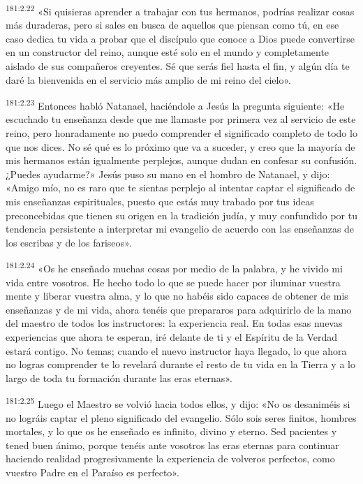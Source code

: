\par 
\textsuperscript{181:2.22} «Si quisieras aprender a trabajar con tus hermanos, podrías realizar cosas más duraderas, pero si sales en busca de aquellos que piensan como tú, en ese caso dedica tu vida a probar que el discípulo que conoce a Dios puede convertirse en un constructor del reino, aunque esté solo en el mundo y completamente aislado de sus compañeros creyentes. Sé que serás fiel hasta el fin, y algún día te daré la bienvenida en el servicio más amplio de mi reino del cielo».

\par 
\textsuperscript{181:2.23} Entonces habló Natanael, haciéndole a Jesús la pregunta siguiente: «He escuchado tu enseñanza desde que me llamaste por primera vez al servicio de este reino, pero honradamente no puedo comprender el significado completo de todo lo que nos dices. No sé qué es lo próximo que va a suceder, y creo que la mayoría de mis hermanos están igualmente perplejos, aunque dudan en confesar su confusión. ¿Puedes ayudarme?» Jesús puso su mano en el hombro de Natanael, y dijo: «Amigo mío, no es raro que te sientas perplejo al intentar captar el significado de mis enseñanzas espirituales, puesto que estás muy trabado por tus ideas preconcebidas que tienen su origen en la tradición judía, y muy confundido por tu tendencia persistente a interpretar mi evangelio de acuerdo con las enseñanzas de los escribas y de los fariseos».

\par 
\textsuperscript{181:2.24} «Os he enseñado muchas cosas por medio de la palabra, y he vivido mi vida entre vosotros. He hecho todo lo que se puede hacer por iluminar vuestra mente y liberar vuestra alma, y lo que no habéis sido capaces de obtener de mis enseñanzas y de mi vida, ahora tenéis que prepararos para adquirirlo de la mano del maestro de todos los instructores: la experiencia real. En todas esas nuevas experiencias que ahora te esperan, iré delante de ti y el Espíritu de la Verdad estará contigo. No temas; cuando el nuevo instructor haya llegado, lo que ahora no logras comprender te lo revelará durante el resto de tu vida en la Tierra y a lo largo de toda tu formación durante las eras eternas».

\par 
\textsuperscript{181:2.25} Luego el Maestro se volvió hacia todos ellos, y dijo: «No os desaniméis si no lográis captar el pleno significado del evangelio. Sólo sois seres finitos, hombres mortales, y lo que os he enseñado es infinito, divino y eterno. Sed pacientes y tened buen ánimo, porque tenéis ante vosotros las eras eternas para continuar haciendo realidad progresivamente la experiencia de volveros perfectos, como vuestro Padre en el Paraíso es perfecto».

